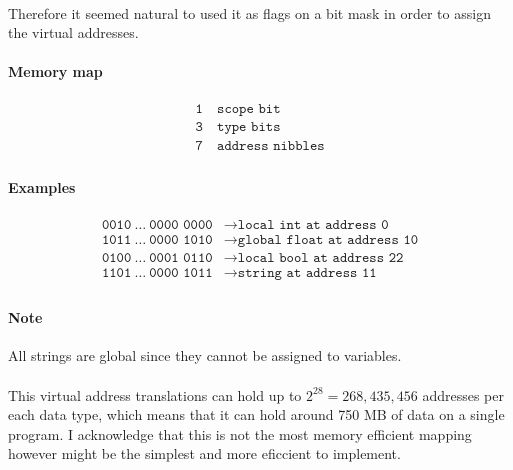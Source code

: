 \paragraph{} Therefore it seemed natural to used it as flags on a bit mask
in order to assign the virtual addresses.

\paragraph{Memory map}

\begin{align*}
    \texttt{1} &\ \texttt{scope bit}\\
    \texttt{3} &\ \texttt{type bits}\\
    \texttt{7} &\ \texttt{address nibbles}\\
\end{align*}

\paragraph{Examples}
\begin{align*}
    \texttt{0010}\ \dots\ \texttt{0000 0000}
    &\rightarrow \texttt{local int at address 0}\\
    \texttt{1011}\ \dots\ \texttt{0000 1010}
    &\rightarrow \texttt{global float at address 10}\\
    \texttt{0100}\ \dots\ \texttt{0001 0110}
    &\rightarrow \texttt{local bool at address 22}\\
    \texttt{1101}\ \dots\ \texttt{0000 1011}
    &\rightarrow \texttt{string at address 11}\\
\end{align*}

\paragraph{Note} All strings are global since they cannot be assigned to
variables.

\paragraph{} This virtual address translations can hold up to $2^{28} =
268,435,456$ addresses per each data type, which means that it can hold around 
750 MB of data on a single program. I acknowledge that this is not the most
memory efficient mapping however might be the simplest and more eficcient to
implement.
